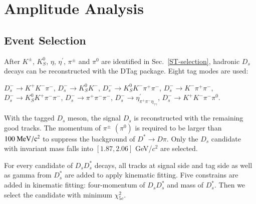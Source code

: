 \section{Amplitude Analysis}
\label{Amplitude-Analysis}
\subsection{Event Selection}
\label{AASelection}
\par{
    After $K^{\pm}$, $K_S^{0}$, $\eta$, $\eta^{'}$, $\pi^{\pm}$ and $\pi^{0}$ are identified in Sec.~\ref{ST-selection}, hadronic $D_{s}$ decays can be reconstructed with the DTag package. 
    Eight tag modes are used:

$D_{s}^{-} \rightarrow K^{+}K^{-}\pi^{-}$, $D_{s}^{-} \rightarrow K_{S}^{0}K^{-}$, $D_{s}^{-} \rightarrow K_{S}^{0}K^{-}\pi^{+}\pi^{-}$, $D_{s}^{-} \rightarrow K^{-}\pi^{+}\pi^{-}$, $D_{s}^{-} \rightarrow K_{S}^{0}K^{+}\pi^{-}\pi^{-}$, $D_{s}^{-} \rightarrow \pi^{+}\pi^{-}\pi^{-}$, $D_{s}^{-} \rightarrow \eta^{'}_{\pi^{+}\pi^{-}\eta_{\gamma\gamma}}$, $D_{s}^{-} \rightarrow K^{+}K^{-}\pi^{-}\pi^{0}$.


With the tagged $D_{s}$ meson, the signal $D_{s}$ is reconstructed with the remaining good tracks. 
The momentum of $\pi^{\pm}$ $(\pi^{0})$ is required to be larger than $100\ {\rm MeV/c^{2}}$ to suppress the background of $D^{*} \rightarrow D\pi$.
Only the $D_{s}$ candidate with invariant mass falls into $[1.87, 2.06]$ GeV/$c^{2}$ are selected.

For every candidate of $D_{s}D_{s}^{*}$ decays, all tracks at signal side and tag side as well as gamma from $D_{s}^{*}$ are added to apply kinematic fitting. Five constrains are added in kinematic fitting: four-momentum of $D_{s}D_{s}^{*}$ and mass of $D_{s}^{*}$. Then we select the candidate with minimum $\chi_{5c}^{2}$.  

}
